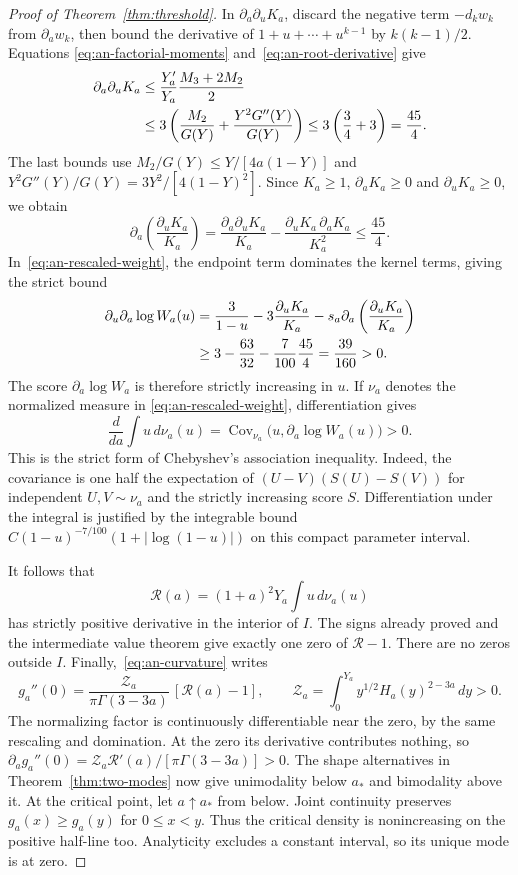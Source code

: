 \begin{proof}[Proof of Theorem~\ref{thm:threshold}]
In $\partial_a\partial_uK_a$, discard the negative term
$-d_kw_k$ from $\partial_aw_k$, then bound the derivative
of $1+u+\cdots+u^{k-1}$ by $k(k-1)/2$. Equations
\eqref{eq:an-factorial-moments} and~\eqref{eq:an-root-derivative} give
\begin{align}
 \partial_a\partial_uK_a
 &\le\frac{Y_a'}{Y_a}\frac{M_3+2M_2}{2}\notag\\
 &\le3\left(\frac{M_2}{G(Y)}+
                       \frac{Y^2G''(Y)}{G(Y)}\right)
 \le3\left(\frac34+3\right)=\frac{45}{4}.
 \label{eq:an-Kau}
\end{align}
The last bounds use
$M_2/G(Y)\le Y/[4a(1-Y)]$ and
$Y^2G''(Y)/G(Y)=3Y^2/[4(1-Y)^2]$.
Since $K_a\ge1$, $\partial_aK_a\ge0$ and
$\partial_uK_a\ge0$, we obtain
\[
 \partial_a\left(\frac{\partial_uK_a}{K_a}\right)
 =\frac{\partial_a\partial_uK_a}{K_a}
  -\frac{\partial_uK_a\,\partial_aK_a}{K_a^2}
 \le\frac{45}{4}.
\]
In~\eqref{eq:an-rescaled-weight}, the endpoint term dominates the kernel
terms, giving the strict bound
\begin{align}
 \partial_u\partial_a\log W_a(u)
 &=\frac3{1-u}-3\frac{\partial_uK_a}{K_a}
    -s_a\partial_a\left(\frac{\partial_uK_a}{K_a}\right)\notag\\
 &\ge3-\frac{63}{32}-\frac7{100}\frac{45}{4}
   =\frac{39}{160}>0.
 \label{eq:an-increasing-score}
\end{align}
The score $\partial_a\log W_a$ is therefore strictly increasing
in $u$. If $\nu_a$ denotes the normalized measure in
\eqref{eq:an-rescaled-weight}, differentiation gives
\[
 \frac{d}{da}\int u\,d\nu_a(u)
 =\operatorname{Cov}_{\nu_a}\bigl(u,\partial_a\log W_a(u)\bigr)>0.
\]
This is the strict form of Chebyshev's association inequality.
Indeed, the covariance is
one half the expectation of
$(U-V)(S(U)-S(V))$ for independent $U,V\sim\nu_a$ and the
strictly increasing score $S$. Differentiation under the
integral is justified by the integrable bound
$C(1-u)^{-7/100}(1+|\log(1-u)|)$ on this compact parameter interval.

It follows that
\[
 \mathcal R(a)=(1+a)^2Y_a\int u\,d\nu_a(u)
\]
has strictly positive derivative in the interior of $I$. The signs already proved
and the intermediate value theorem give
exactly one zero of $\mathcal R-1$. There are no zeros outside $I$.
Finally,~\eqref{eq:an-curvature} writes
\[
 g_a''(0)=\frac{\mathcal Z_a}{\pi\Gamma(3-3a)}\,[\mathcal R(a)-1],
 \qquad \mathcal Z_a=\int_0^{Y_a}y^{1/2}H_a(y)^{2-3a}\,d y>0.
\]
The normalizing factor is continuously differentiable near the
zero, by the same rescaling and domination. At the zero its
derivative contributes nothing, so
$\partial_ag_a''(0)=\mathcal Z_a\mathcal R'(a)/[\pi\Gamma(3-3a)]>0$.
The shape alternatives in Theorem~\ref{thm:two-modes} now give
unimodality below $a_*$ and bimodality above it. At the critical
point, let $a\uparrow a_*$ from below. Joint continuity preserves
$g_a(x)\ge g_a(y)$ for $0\le x<y$. Thus the critical density is
nonincreasing on the positive half-line too. Analyticity excludes
a constant interval, so its unique mode is at zero.
\end{proof}

